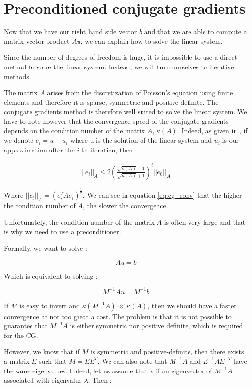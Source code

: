 \section{Preconditioned conjugate gradients}

Now that we have our right hand side vector $b$ and that we are able to compute a matrix-vector product $Au$, we can explain how to solve the linear system. 

Since the number of degrees of freedom is huge, it is impossible to use a direct method to solve the linear system. Instead, we will turn ourselves to iterative methods. 

The matrix $A$ arises from the discretization of Poisson's equation using finite elements and therefore it is sparse, symmetric and positive-definite. The conjugate gradients method is therefore well suited to solve the linear system. We have to note however that the convergence speed of the conjugate gradients depends on the condition number of the matrix $A$, $\kappa(A)$. Indeed, as given in \cite{conj_grad}, if we denote $e_i = u-u_i$ where u is the solution of the linear system and $u_i$ is our approximation after the $i$-th iteration, then : 

\begin{align}
||e_i||_A \leq 2 \left(\frac{\sqrt{\kappa(A)}-1}{\sqrt{\kappa(A)}+1}\right)^i ||e_0||_A \label{eq:cg_conv}
\end{align}


Where $||e_i||_A = \left(e_i^TAe_i\right)^\frac{1}{2}$. We can see in equation \ref{eq:cg_conv} that the higher the condition number of $A$, the slower the convergence.  

Unfortunately, the condition number of the matrix $A$ is often very large and that is why we need to use a preconditioner. 

Formally, we want to solve : 

$$Au=b$$

Which is equivalent to solving : 

$$M^{-1}A u = M^{-1}b$$

If $M$ is easy to invert and $\kappa(M^{-1}A) \ll \kappa(A)$, then we should have a faster convergence at not too great a cost. The problem is that it is not possible to guarantee that $M^{-1}A$ is either symmetric nor positive definite, which is required for the CG.

However, we know that if $M$ is symmetric and positive-definite, then there exists a matrix $E$ such that $M = EE^T$. We can also note that $M^{-1}A$ and $E^{-1}AE^{-T}$ have the same eigenvalues. Indeed, let us assume that $v$ if an eigenvector of $M^{-1}A$ associated with eigenvalue $\lambda$. Then :


